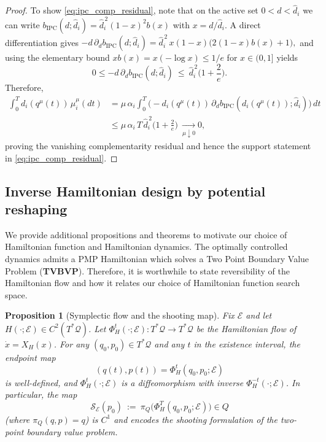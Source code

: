 \documentclass{article} %
\newtheorem{proposition}[theorem]{Proposition}
\begin{document}
\begin{proof}
To show \cref{eq:ipc_comp_residual}, note that on the active set $0<d<\hat d_i$ we can write
$b_{\mathrm{IPC}}(d;\hat d_i)=\hat d_i^{\,2}(1-x)^2b(x)$ with $x=d/\hat d_i$.
A direct differentiation gives
\(
-d\,\partial_d b_{\mathrm{IPC}}(d;\hat d_i)
=
\hat d_i^{\,2}\,x(1-x)\big(2(1-x)b(x)+1\big),
\)
and using the elementary bound $xb(x)=x(-\log x)\le 1/e$ for $x\in(0,1]$ yields
\[
0\le -d\,\partial_d b_{\mathrm{IPC}}(d;\hat d_i)\ \le\ \hat d_i^{\,2}\Big(1+\frac{2}{e}\Big).
\]
Therefore,
\begin{equation}
\begin{aligned}
\int_0^T d_i(q^\mu(t))\,\mu_i^\mu(dt)
&= \mu\,\alpha_i\int_0^T \Big(-d_i(q^\mu(t))\,\partial_d b_{\mathrm{IPC}}(d_i(q^\mu(t));\hat d_i)\Big)\,dt \\
&\leq \mu\,\alpha_i\,T\,\hat d_i^{\,2}\Big(1+\frac{2}{e}\Big)\ \xrightarrow[\mu\downarrow 0]{} 0,        
\end{aligned}
\end{equation}
proving the vanishing complementarity residual and hence the support statement in \cref{eq:ipc_comp_residual}.
\end{proof}




\subsection{Inverse Hamiltonian design by potential reshaping}
\label{app:inverse_design}


We provide additional propositions and theorems to motivate our choice of Hamiltonian function and Hamiltonian dynamics. The optimally controlled dynamics admits a PMP Hamiltonian which solves a Two Point Boundary Value Problem (\textbf{TVBVP}). Therefore, it is worthwhile to state reversibility of the Hamiltonian flow and how it relates our choice of Hamiltonian function search space.

\begin{proposition}[Symplectic flow and the shooting map]
\label{lem:symplectic_flow_shooting}
Fix $\mathcal E$ and let $H(\cdot;\mathcal E)\in C^2(T^{*}\mathcal{Q})$.
Let $\Phi_H^t(\cdot;\mathcal E):T^{*}\mathcal{Q}\to T^{*}\mathcal{Q}$ be the Hamiltonian flow of $\dot x=X_H(x)$.
For any $(q_0,p_0)\in T^{*}{\mathcal{Q}}$ and any $t$ in the existence interval, the endpoint map
\[
(q(t),p(t))=\Phi_H^t(q_0,p_0;\mathcal E)
\]
is well-defined, and $\Phi_H^t(\cdot;\mathcal E)$ is a diffeomorphism with inverse $\Phi_H^{-t}(\cdot;\mathcal E)$.
In particular, the map
\[
\mathcal S_{\mathcal E}(p_0)\ :=\ \pi_Q\!\big(\Phi_H^{T}(q_0,p_0;\mathcal E)\big)\in Q
\]
(where $\pi_Q(q,p)=q$) is $C^1$ and encodes the \emph{shooting formulation} of the two-point boundary value problem.
\end{proposition}
\end{document}
